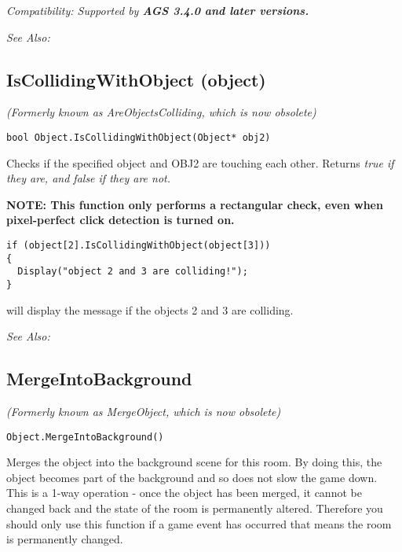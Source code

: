 \it{Compatibility:} Supported by \bf{AGS 3.4.0} and later versions.

\it{See Also:} 


\subsection{IsCollidingWithObject (object)}\label{Object.IsCollidingWithObject}%

\it{(Formerly known as AreObjectsColliding, which is now obsolete)}

\begin{verbatim}
bool Object.IsCollidingWithObject(Object* obj2)
\end{verbatim}
Checks if the specified object and OBJ2 are touching each other. Returns \it{true} if they
are, and \it{false} if they are not.

\bf{NOTE:} This function only performs a rectangular check, even when pixel-perfect
click detection is turned on.

\begin{verbatim}
if (object[2].IsCollidingWithObject(object[3]))
{
  Display("object 2 and 3 are colliding!");
}
\end{verbatim}
will display the message if the objects 2 and 3 are colliding.

\it{See Also:} 


\subsection{MergeIntoBackground}\label{Object.MergeIntoBackground}%

\it{(Formerly known as MergeObject, which is now obsolete)}

\begin{verbatim}
Object.MergeIntoBackground()
\end{verbatim}
Merges the object into the background scene for this room.
By doing this, the object becomes part of the background and so does not
slow the game down. This is a 1-way operation - once the object has
been merged, it cannot be changed back and the state of the room is
permanently altered. Therefore you should only use this function if a game
event has occurred that means the room is permanently changed.

